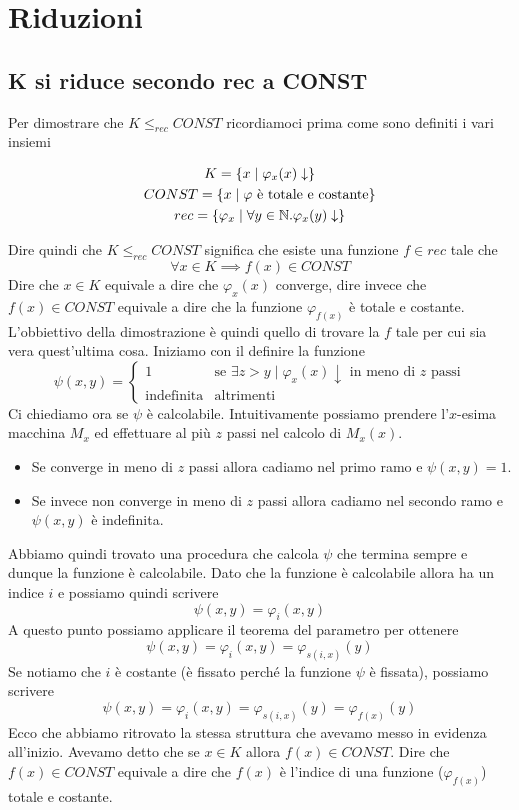 \section{Riduzioni}

\subsection{K si riduce secondo rec a CONST}

Per dimostrare che $K \leq_{rec} CONST$ ricordiamoci prima come
sono definiti i vari insiemi

\begin{gather*}
	K = \{ x \mid \varphi_x (x) \downarrow \} \\
	CONST = \{ x \mid \varphi \text{ è totale e costante} \} \\
	rec = \{ \varphi_x \mid \forall y \in \mathbb{N} . \varphi_x (y) \downarrow \}
\end{gather*}

Dire quindi che $K \leq_{rec} CONST$ significa che esiste una funzione
$f \in rec$ tale che
\[ \forall x \in K \implies f(x) \in CONST \]
Dire che $x \in K$ equivale a dire che $\varphi_x (x)$ converge,
dire invece che $f(x) \in CONST$ equivale a dire che la funzione
$\varphi_{f(x)}$ è totale e costante. L'obbiettivo della
dimostrazione è quindi quello di trovare la $f$ tale per cui sia
vera quest'ultima cosa. Iniziamo con il definire la funzione
\[
	\psi (x, y) = \begin{cases}
		1                 & \text{se } \exists z > y \mid
		\varphi_x(x) \downarrow \text{ in meno di $z$ passi} \\
		\text{indefinita} & \text{altrimenti}
	\end{cases}
\]
Ci chiediamo ora se $\psi$ è calcolabile. Intuitivamente possiamo
prendere l'$x$-esima macchina $M_x$ ed effettuare al più $z$
passi nel calcolo di $M_x(x)$.
\begin{itemize}
	\item Se converge in meno di $z$ passi allora cadiamo nel
	      primo ramo e $\psi(x, y) = 1$.
	\item Se invece non converge in meno di $z$ passi allora
	      cadiamo nel secondo ramo e $\psi(x,y)$ è indefinita.
\end{itemize}
Abbiamo quindi trovato una procedura che calcola $\psi$ che
termina sempre e dunque la funzione è calcolabile. Dato che la
funzione è calcolabile allora ha un indice $i$ e possiamo quindi
scrivere
\[ \psi(x, y) = \varphi_i (x, y) \]
A questo punto possiamo applicare il teorema del parametro per
ottenere
\[ \psi(x, y) = \varphi_i (x, y) = \varphi_{s(i,x)} (y) \]
Se notiamo che $i$ è costante (è fissato perché la funzione
$\psi$ è fissata), possiamo scrivere
\[
	\psi(x, y) = \varphi_i (x, y) =
	\varphi_{s(i,x)} (y) = \varphi_{f(x)} (y)
\]
Ecco che abbiamo ritrovato la stessa struttura che avevamo messo
in evidenza all'inizio. Avevamo detto che se $x \in K$ allora
$f(x) \in CONST$. Dire che $f(x) \in CONST$ equivale a dire che
$f(x)$ è l'indice di una funzione ($\varphi_{f(x)}$) totale e
costante.

